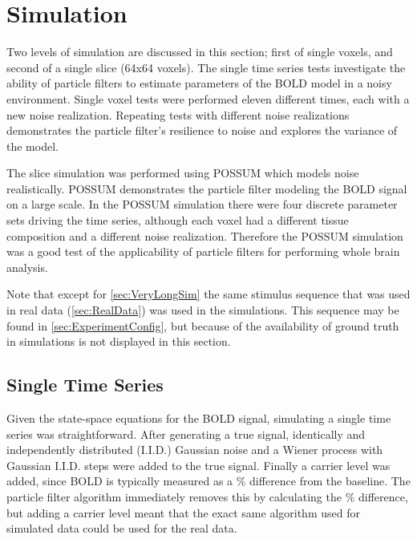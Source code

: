 \chapter{Simulation}
\label{sec:SimulationResults}
Two levels of simulation are discussed in this section; first of single voxels,
and second of a single slice (64x64 voxels).  The single time series tests
investigate the ability of particle filters to estimate parameters of the \ac{BOLD} model
in a noisy environment. Single voxel tests were
performed eleven different times, each with a new noise realization.
Repeating tests with different noise realizations demonstrates the
particle filter's resilience to noise and explores the variance of
the model.

The slice simulation was performed using
\ac{POSSUM} which
models noise realistically. \ac{POSSUM} demonstrates the
particle filter modeling the \ac{BOLD} signal on a large scale.
In the \ac{POSSUM} simulation there were four
discrete parameter sets driving the time series, although each voxel had a
different tissue composition and a different
noise realization. Therefore the \ac{POSSUM} simulation was
a good test of the applicability of particle filters for performing
whole brain analysis.

Note that except for \autoref{sec:VeryLongSim} the same stimulus sequence
that was used in real data (\autoref{sec:RealData}) was used in the simulations. This sequence may
be found in \autoref{sec:ExperimentConfig}, but because of the availability of ground
truth in simulations is not displayed in this section.

\section{Single Time Series}
\label{sec:Single Voxel Simulation}
Given the state-space equations for the \ac{BOLD} signal, simulating a single time
series was straightforward. After generating a true signal,
identically and independently distributed (I.I.D.) Gaussian noise and a Wiener
process with Gaussian I.I.D. steps were added to the true signal. Finally a
carrier level was added, since \ac{BOLD} is typically
measured as a \% difference from the baseline. The particle filter
algorithm immediately removes this by calculating the \% difference,
but adding a carrier level meant that the exact same algorithm used
for simulated data could be used for the real data.

